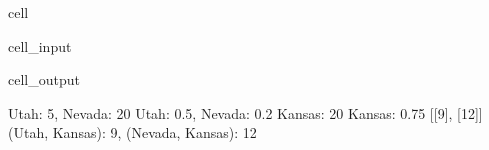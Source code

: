 \documentclass[letterpaper,10pt,english]{jupyterBook}
\begin{document}
\begin{sphinxuseclass}{cell}
\begin{sphinxVerbatimInput}
\begin{sphinxuseclass}{cell_input}
\begin{sphinxVerbatim}[commandchars=\\\{\}]
  
   
     
    \PYG{p}{[}\PYG{p}{[}\PYG{p}{]}\PYG{p}{[}\PYG{p}{]}\PYG{p}{]}  \PYG{p}{[}\PYG{p}{]}\PYG{p}{[}\PYG{p}{]}

\end{sphinxVerbatim}

\end{sphinxuseclass}\end{sphinxVerbatimInput}
\begin{sphinxVerbatimOutput}

\begin{sphinxuseclass}{cell_output}
\begin{sphinxVerbatim}[commandchars=\\\{\}]
\PYGZob{}\PYGZsq{}Utah\PYGZsq{}: 5, \PYGZsq{}Nevada\PYGZsq{}: 20\PYGZcb{}
\PYGZob{}\PYGZsq{}Utah\PYGZsq{}: 0.5, \PYGZsq{}Nevada\PYGZsq{}: 0.2\PYGZcb{}
\PYGZob{}\PYGZsq{}Kansas\PYGZsq{}: 20\PYGZcb{}
\PYGZob{}\PYGZsq{}Kansas\PYGZsq{}: 0.75\PYGZcb{}
[[9], [12]]
\PYGZob{}(\PYGZsq{}Utah\PYGZsq{}, \PYGZsq{}Kansas\PYGZsq{}): 9, (\PYGZsq{}Nevada\PYGZsq{}, \PYGZsq{}Kansas\PYGZsq{}): 12\PYGZcb{}
\end{sphinxVerbatim}

\end{sphinxuseclass}\end{sphinxVerbatimOutput}

\end{sphinxuseclass}
\end{document}
